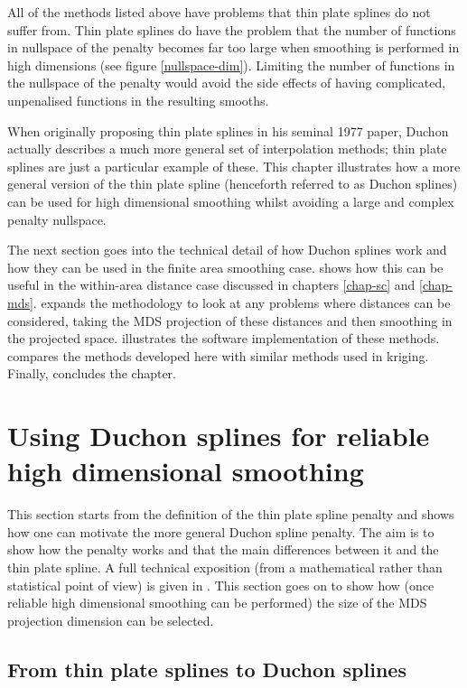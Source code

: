 All of the methods listed above have problems that thin plate splines do not suffer from. Thin plate splines do have the problem that the number of functions in nullspace of the penalty becomes far too large when smoothing is performed in high dimensions (see figure \ref{nullspace-dim}). Limiting the number of functions in the nullspace of the penalty would avoid the side effects of having complicated, unpenalised functions in the resulting smooths. 

When originally proposing thin plate splines in his seminal 1977 paper, Duchon actually describes a much more general set of interpolation methods; thin plate splines are just a particular example of these. This chapter illustrates how a more general version of the thin plate spline (henceforth referred to as Duchon splines) can be used for high dimensional smoothing whilst avoiding a large and complex penalty nullspace.

The next section goes into the technical detail of how Duchon splines work and how they can be used in the finite area smoothing case.  shows how this can be useful in the within-area distance case discussed in chapters \ref{chap-sc} and \ref{chap-mds}.  expands the methodology to look at any problems where distances can be considered, taking the MDS projection of these distances and then smoothing in the projected space.  illustrates the software implementation of these methods.  compares the methods developed here with similar methods used in kriging. Finally,  concludes the chapter.

\section{Using Duchon splines for reliable high dimensional smoothing}

This section starts from the definition of the thin plate spline penalty and shows how one can motivate the more general Duchon spline penalty. The aim is to show how the penalty works and that the main differences between it and the thin plate spline. A full technical exposition (from a mathematical rather than statistical point of view) is given in . This section goes on to show how (once reliable high dimensional smoothing can be performed) the size of the MDS projection dimension can be selected.

\subsection{From thin plate splines to Duchon splines}
\label{gds-tprstoduchon}

